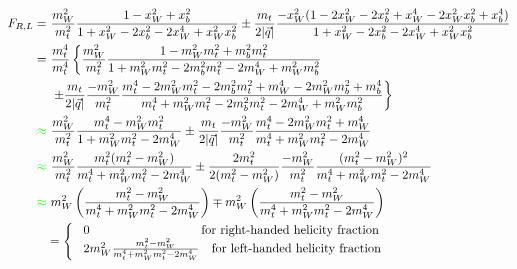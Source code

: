 \begin{subequations}
 \begin{align*}
  F_{R,L} = & ~\frac{m_{W}^{2}}{m_{t}^{2}} \frac{1 - x_{W}^{2} + x_{b}^{2}}{1 + x_{W}^{2} - 2x_{b}^{2} - 2 x_{W}^{4} + x_{W}^{2} x_{b}^{2}} \pm \frac{m_{t}}{2 \vert \vec{q} \vert} \frac{ -x_{W}^{2} (1-2x_{W}^{2} - 2x_{b}^{2} + x_{W}^{4} - 2x_{W}^{2} x_{b}^{2} + x_{b}^{4})}{1 + x_{W}^{2} - 2x_{b}^{2} - 2 x_{W}^{4} + x_{W}^{2} x_{b}^{2}} \\
          = & ~\frac{m_{t}^{4}}{m_{t}^{4}} \left\lbrace \frac{m_{W}^{2}}{m_{t}^{2}}  \frac{1 - m_{W}^{2}m_{t}^{2} + m_{b}^{2}m_{t}^{2}}{1 + m_{W}^{2}m_{t}^{2} - 2m_{b}^{2}m_{t}^{2} - 2 m_{W}^{4} + m_{W}^{2} m_{b}^{2}} \right. \\
            & ~\left. \pm \frac{m_{t}}{2 \vert \vec{q} \vert} \frac{ -m_{W}^{2}}{m_{t}^{2}} \frac{m_{t}^{4} - 2m_{W}^{2}m_{t}^{2} - 2m_{b}^{2}m_{t}^{2} + m_{W}^{4} - 2m_{W}^{2} m_{b}^{2} + m_{b}^{4}}{m_{t}^{4} + m_{W}^{2}m_{t}^{2} - 2m_{b}^{2}m_{t}^{2} - 2 m_{W}^{4} + m_{W}^{2} m_{b}^{2}} \right\rbrace \\          
          \textcolor{green}{\approx} & ~\frac{m_{W}^{2}}{m_{t}^{2}}  \frac{m_{t}^{4} - m_{W}^{2}m_{t}^{2}}{1 + m_{W}^{2}m_{t}^{2} - 2 m_{W}^{4}} \pm \frac{m_{t}}{2 \vert \vec{q} \vert} \frac{ -m_{W}^{2}}{m_{t}^{2}} \frac{m_{t}^{4} - 2m_{W}^{2}m_{t}^{2} + m_{W}^{4}}{m_{t}^{4} + m_{W}^{2}m_{t}^{2} - 2 m_{W}^{4}} \\
          \textcolor{green}{\approx} & ~\frac{m_{W}^{2}}{m_{t}^{2}}  \frac{m_{t}^{2}(m_{t}^{2} - m_{W}^{2})}{m_{t}^{4} + m_{W}^{2}m_{t}^{2} - 2 m_{W}^{4}} \pm \frac{2m_{t}^{2}}{2 (m_{t}^{2} - m_{W}^{2})} \frac{ -m_{W}^{2}}{m_{t}^{2}} \frac{(m_{t}^{2} - m_{W}^{2})^{2}}{m_{t}^{4} + m_{W}^{2}m_{t}^{2} - 2 m_{W}^{4}} \\
          \textcolor{green}{\approx} & ~m_{W}^{2} \left( \frac{m_{t}^{2} - m_{W}^{2}}{m_{t}^{4} + m_{W}^{2}m_{t}^{2} - 2 m_{W}^{4}} \right) \mp m_{W}^{2} \left( \frac{m_{t}^{2} - m_{W}^{2}}{m_{t}^{4} + m_{W}^{2}m_{t}^{2} - 2 m_{W}^{4}} \right) \\
          & = \left\{ \begin{array}{l} 
            ~ 0 \qquad \qquad \qquad \quad \quad ~~~ \textrm{for right-handed helicity fraction} \\
            ~2m_{W}^{2} \frac{m_{t}^{2} - m_{W}^{2}}{m_{t}^{4} + m_{W}^{2}m_{t}^{2} - 2 m_{W}^{4}} \quad \textrm{for left-handed helicity fraction}
          \end{array} \right. 
 \end{align*}
\end{subequations}

